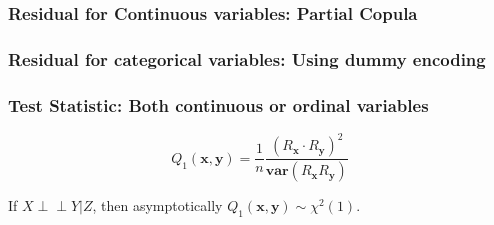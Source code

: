 \documentclass{beamer}
\def\ci{\perp\!\!\!\!\!\perp}
\begin{document}
\begin{frame}
	\frametitle{Residual for Continuous variables: Partial Copula}
\end{frame}

% 

\begin{frame}
	\frametitle{Residual for categorical variables: Using dummy encoding}
\end{frame}

\begin{frame}
	\frametitle{Test Statistic: Both continuous or ordinal variables}
	$$ Q_1(\bm{x}, \bm{y}) = \frac{1}{n} \frac{(R_{\bm{x}} \cdot R_{\bm{y}})^2}{\bm{var}(R_{\bm{x}} R_{\bm{y}})} $$
	\begin{center}
	If $ X \ci Y | Z $, then asymptotically $ Q_1(\bm{x}, \bm{y}) \sim \chi^2(1) $.
	\end{center}


\end{frame}
\end{document}
